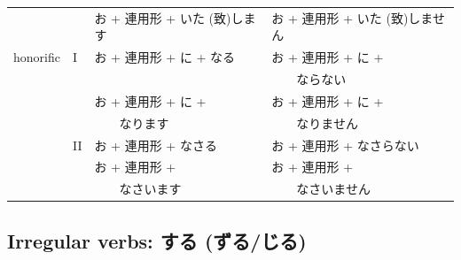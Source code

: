 \documentclass[11pt, b5paper, twoside, openright, onecolumn]{book}
\makeatletter
\newcommand*{\rtrubystack}[2]{{\relscale{0.5}%
  \begin{tabular}[b]{@{}c@{}}%
    {#1}\\%
    {\textscale{2}{#2}}%
  \end{tabular}}%
}
\DeclareRobustCommand*{\rtruby}[2]{%
  \mbox{%
    \setlength{\parskip}{0ex}%
    \BeginAccSupp{method=pdfstringdef,ActualText={#1}}%
      \rtrubystack{\phantom{#2}}{#1}%
      \llap{%
        \rtrubystack{#2}{\phantom{#1}}%
      }%
    \EndAccSupp{}%
  }%
}
\renewcommand*{\rtruby}[2]{#2 (#1)}%
\makeatother
\begin{document}
\begin{longtable}[h]{| l  l  l  l |}
\rule{0pt}{3.6ex} &  & お + 連用形 + \rtruby{致}{いた}します & お + 連用形 + \rtruby{致}{いた}しません\\ 
\rule{0pt}{2.4ex}honorific & I & お + 連用形 + に + なる & お + 連用形 + に +\\ 
\rule{0pt}{2.4ex} &  &  & 　　ならない\\ 
\rule{0pt}{2.4ex} &  & お + 連用形 + に + & お + 連用形 + に +\\ 
\rule{0pt}{2.4ex} &  & 　　なります & 　　なりません\\ 
\rule{0pt}{2.4ex} & II & お + 連用形 + なさる & お + 連用形 + なさらない\\ 
\rule{0pt}{2.4ex} &  & お + 連用形 + & お + 連用形 +\\ 
\rule{0pt}{2.4ex} &  & 　　なさいます & 　　なさいません\\ 
\end{longtable}
\larger

\subsection{Irregular verbs: する (ずる/じる)}
\end{document}

